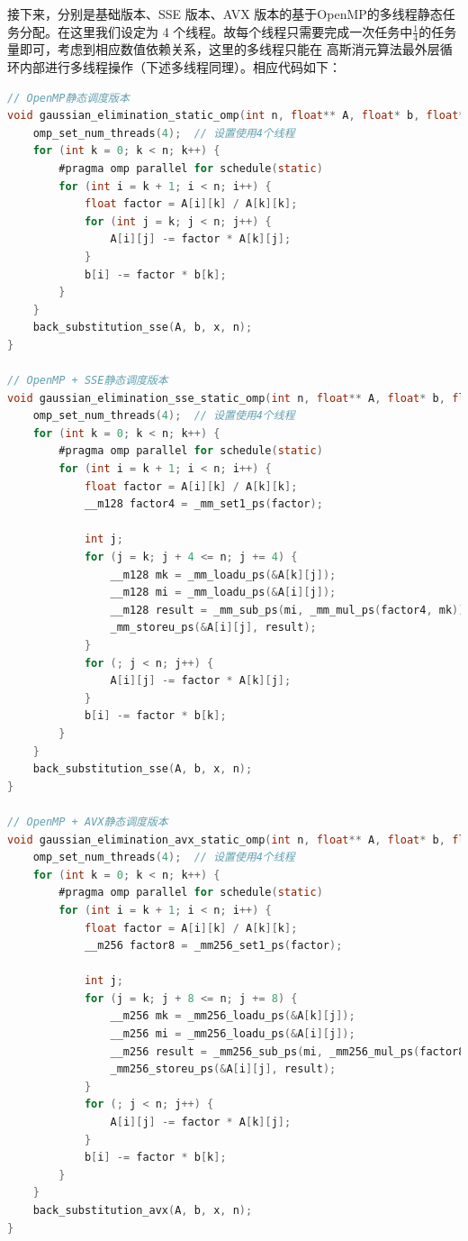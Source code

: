 \documentclass{nku}
\begin{document}
接下来，分别是基础版本、SSE 版本、AVX 版本的基于OpenMP的多线程静态任务分配。在这里我们设定为 4 个线程。故每个线程只需要完成一次任务中$\frac{1}{4}$的任务量即可，考虑到相应数值依赖关系，这里的多线程只能在
高斯消元算法最外层循环内部进行多线程操作（下述多线程同理）。相应代码如下：
\begin{lstlisting}[language=C]
// OpenMP静态调度版本
void gaussian_elimination_static_omp(int n, float** A, float* b, float* x) {
    omp_set_num_threads(4);  // 设置使用4个线程
    for (int k = 0; k < n; k++) {
        #pragma omp parallel for schedule(static)
        for (int i = k + 1; i < n; i++) {
            float factor = A[i][k] / A[k][k];
            for (int j = k; j < n; j++) {
                A[i][j] -= factor * A[k][j];
            }
            b[i] -= factor * b[k];
        }
    }
    back_substitution_sse(A, b, x, n);
}

// OpenMP + SSE静态调度版本
void gaussian_elimination_sse_static_omp(int n, float** A, float* b, float* x) {
    omp_set_num_threads(4);  // 设置使用4个线程
    for (int k = 0; k < n; k++) {
        #pragma omp parallel for schedule(static)
        for (int i = k + 1; i < n; i++) {
            float factor = A[i][k] / A[k][k];
            __m128 factor4 = _mm_set1_ps(factor);

            int j;
            for (j = k; j + 4 <= n; j += 4) {
                __m128 mk = _mm_loadu_ps(&A[k][j]);
                __m128 mi = _mm_loadu_ps(&A[i][j]);
                __m128 result = _mm_sub_ps(mi, _mm_mul_ps(factor4, mk));
                _mm_storeu_ps(&A[i][j], result);
            }
            for (; j < n; j++) {
                A[i][j] -= factor * A[k][j];
            }
            b[i] -= factor * b[k];
        }
    }
    back_substitution_sse(A, b, x, n);
}

// OpenMP + AVX静态调度版本
void gaussian_elimination_avx_static_omp(int n, float** A, float* b, float* x) {
    omp_set_num_threads(4);  // 设置使用4个线程
    for (int k = 0; k < n; k++) {
        #pragma omp parallel for schedule(static)
        for (int i = k + 1; i < n; i++) {
            float factor = A[i][k] / A[k][k];
            __m256 factor8 = _mm256_set1_ps(factor);

            int j;
            for (j = k; j + 8 <= n; j += 8) {
                __m256 mk = _mm256_loadu_ps(&A[k][j]);
                __m256 mi = _mm256_loadu_ps(&A[i][j]);
                __m256 result = _mm256_sub_ps(mi, _mm256_mul_ps(factor8, mk));
                _mm256_storeu_ps(&A[i][j], result);
            }
            for (; j < n; j++) {
                A[i][j] -= factor * A[k][j];
            }
            b[i] -= factor * b[k];
        }
    }
    back_substitution_avx(A, b, x, n);
}
\end{lstlisting}
\end{document}
